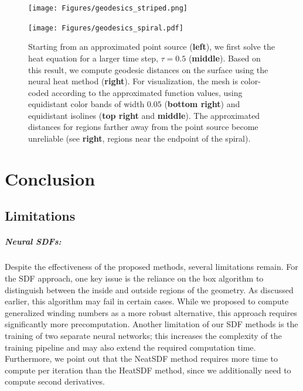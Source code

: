 \documentclass[12pt,openany]{book}
\theoremstyle{plainnormal}
\theoremstyle{remark}
\begin{document}
\begin{figure}[htbp]
  \centering
  \begin{minipage}[c]{0.45\textwidth}
    \texttt{[image: Figures/geodesics\_striped.png]}
  \end{minipage}%
  \hfill
  \begin{minipage}[c]{0.45\textwidth}
    \label{fig:geodINHeat2}
  \end{minipage}
\end{figure}

\begin{figure}
    \texttt{[image: Figures/geodesics\_spiral.pdf]}
\caption{Starting from an approximated point source (\textbf{left}), we first solve the heat equation for a larger time step, $\tau = 0.5$ (\textbf{middle}). Based on this result, we compute geodesic distances on the surface using the neural heat method (\textbf{right}). For visualization, the mesh is color-coded according to the approximated function values, using equidistant color bands of width $0.05$ (\textbf{bottom right}) and equidistant isolines (\textbf{top right} and \textbf{middle}). The approximated distances for regions farther away from the point source become unreliable (see \textbf{right}, regions near the endpoint of the spiral).}\label{}
\end{figure}

\clearpage
\chapter{Conclusion}
\begingroup
\let\clearpage\relax
\section{Limitations}
\paragraph{Neural SDFs:} Despite the effectiveness of the proposed methods, several limitations remain. For the SDF approach, one key issue is the reliance on the box algorithm to distinguish between the inside and outside regions of the geometry. As discussed earlier, this algorithm may fail in certain cases. While we proposed to compute generalized winding numbers as a more robust alternative, this approach requires significantly more precomputation. Another limitation of our SDF methods is the training of two separate neural networks; this increases the complexity of the training pipeline and may also extend the required computation time. Furthermore, we point out that the NeatSDF method requires more time to compute per iteration than the HeatSDF method, since we additionally need to compute second derivatives.
\end{document}
